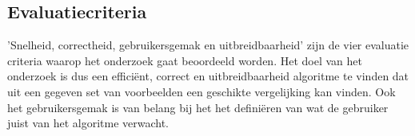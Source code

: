 \documentclass[Main.tex]{subfiles}
\begin{document}
\subsection{Evaluatiecriteria}

'Snelheid, correctheid, gebruikersgemak en uitbreidbaarheid' zijn de vier evaluatie criteria waarop het onderzoek gaat beoordeeld worden. Het doel van het onderzoek is dus een effici\"ent, correct en uitbreidbaarheid algoritme te vinden dat uit een gegeven set van voorbeelden een geschikte vergelijking kan vinden. Ook het gebruikersgemak is van belang bij het het defini\"eren van wat de gebruiker juist van het algoritme verwacht.
\end{document}

